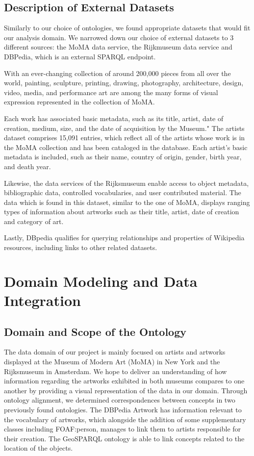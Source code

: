 \documentclass{article}
\begin{document}
\subsection{Description of External Datasets}

Similarly to our choice of ontologies, we found appropriate datasets that would fit our analysis domain. We narrowed down our choice of external datasets to 3 different sources: the MoMA data service\cite{Moma}, the Rijkmuseum data service\cite{Rijks} and DBPedia, which is an external SPARQL endpoint\cite{Dbpedia}. 

With an ever-changing collection of around 200,000 pieces from all over the world, painting, sculpture, printing, drawing, photography, architecture, design, video, media, and performance art are among the many forms of visual expression represented in the collection of MoMA.

Each work has associated basic metadata, such as its title, artist, date of creation, medium, size, and the date of acquisition by the Museum." The artists dataset comprises 15,091 entries, which reflect all of the artists whose work is in the MoMA collection and has been cataloged in the database. Each artist's basic metadata is included, such as their name, country of origin, gender, birth year, and death year.

Likewise, the data services of the Rijksmuseum enable access to object metadata, bibliographic data, controlled vocabularies, and user contributed material. The data which is found in this dataset, similar to the one of MoMA, displays ranging types of information about artworks such as their title, artist, date of creation and category of art.

Lastly, DBpedia qualifies for querying relationships and properties of Wikipedia resources, including links to other related datasets.


\section{Domain Modeling and Data Integration}


\subsection{Domain and Scope of the Ontology}


The data domain of our project is mainly focused on artists and artworks displayed at the Museum of Modern Art (MoMA) in New York and the Rijksmuseum in Amsterdam. We hope to deliver an understanding of how information regarding the artworks exhibited in both museums compares to one another by providing a visual representation of the data in our domain. Through ontology alignment, we determined correspondences between concepts in two previously found ontologies. The DBPedia Artwork has information relevant to the vocabulary of artworks, which alongside the addition of some supplementary classes including FOAF:person, manages to link them to artists responsible for their creation. The GeoSPARQL ontology is able to link concepts related to the location of the objects.
\end{document}
